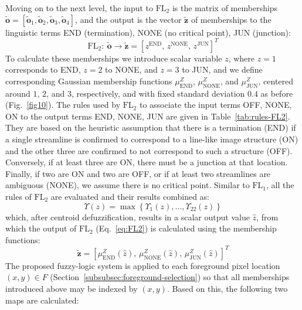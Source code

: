 Moving on to the next level, the input to $\mathrm{FL}_{2}$ is the matrix of memberships $\tilde{\mathbf{o}}=\left[\tilde{\mathbf{o}}_{1},\tilde{\mathbf{o}}_{2},\tilde{\mathbf{o}}_{3},\tilde{\mathbf{o}}_{4}\right]$, and the output is the vector $\tilde{\mathbf{z}}$ of memberships to the linguistic terms END (termination), NONE (no critical point), JUN (junction):
\begin{equation}
\mathrm{FL}_{2}\!:\ \tilde{\mathbf{o}} \rightarrow \tilde{\mathbf{z}} = \left[z^{\textrm{END}}\!,\, z^{\textrm{NONE}}\!,\, z^{\textrm{JUN}}\right]^T
\label{eq:FL2}
\end{equation}
To calculate these memberships we introduce scalar variable $z$, where $z=1$ corresponds to END, $z=2$ to NONE, and $z=3$ to JUN, and we define corresponding Gaussian membership functions $\mu_{\textrm{END}}^{Z}$, $\mu_{\textrm{NONE}}^{Z}$, and $\mu_{\textrm{JUN}}^{Z}$, centered around $1$, $2$, and $3$, respectively, and with fixed standard deviation $0.4$ as before (Fig.~\ref{fig10}). The rules used by $\mathrm{FL}_{2}$ to associate the input terms OFF, NONE, ON to the output terms END, NONE, JUN are given in Table~\ref{tab:rules-FL2}. They are based on the heuristic assumption that there is a termination (END) if a single streamline is confirmed to correspond to a line-like image structure (ON) and the other three are confirmed to not correspond to such a structure (OFF). Conversely, if at least three are ON, there must be a junction at that location. Finally, if two are ON and two are OFF, or if at least two streamlines are ambiguous (NONE), we assume there is no critical point. Similar to $\mathrm{FL}_{1}$, all the rules of $\mathrm{FL}_{2}$ are evaluated and their results combined as:
\begin{equation}
\Upsilon(z) = \max\left\{\Upsilon_{1}(z),\dots,\Upsilon_{22}(z)\right\}
\end{equation}
which, after centroid defuzzification, results in a scalar output value $\hat{z}$, from which the output of $\mathrm{FL}_{2}$ (Eq.~\ref{eq:FL2}) is calculated using the membership functions:
\begin{equation}
\tilde{\mathbf{z}} = \left[\mu_{\textrm{END}}^{Z}(\hat{z}),\, \mu_{\textrm{NONE}}^{Z}(\hat{z}),\, \mu_{\textrm{JUN}}^{Z}(\hat{z})\right]^{T}
\end{equation}
The proposed fuzzy-logic system is applied to each foreground pixel location $(x,y)\in F$ (Section~\ref{subsubsec:foreground-selection}) so that all memberships introduced above may be indexed by $(x,y)$. Based on this, the following two maps are calculated:
